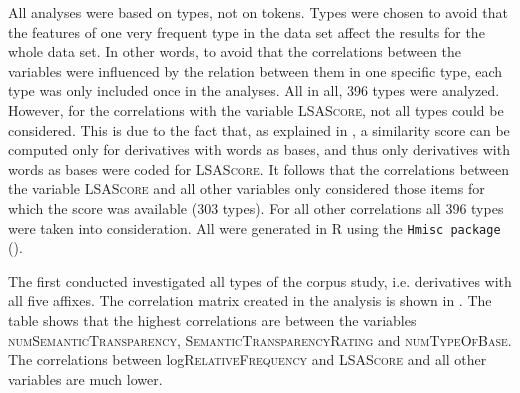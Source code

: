 All analyses were based on types, not on tokens. Types were chosen to avoid that the  features of one very frequent type in the data set affect the results for the whole data set. In other words, to avoid that the correlations between the variables were influenced by the relation between them in one specific type, each type was only included once in the analyses. 
All in all, 396 types were analyzed. However, for the correlations with the variable \textsc{LSAScore}, not all types could be considered. This is due to the fact that, as explained in , a similarity score can be computed only for derivatives with words as bases, and thus only derivatives with words as bases were coded for \textsc{LSAScore}. It follows that the correlations between the variable \textsc{LSAScore} and all other variables only considered those items for which the score was available (303 types). For all other correlations all 396 types were taken into consideration. 
All  were generated in R using the \texttt{Hmisc package} (\citealt{Harrell.2017}).

The first  conducted investigated all types of the corpus study, i.e. derivatives with all five affixes. The correlation matrix created in the analysis is shown in . The table shows that the highest correlations are between the variables \textsc{numSemanticTransparency}, \textsc{SemanticTransparencyRating} and \textsc{numTypeOfBase}. The correlations between log\textsc{RelativeFrequency} and \textsc{LSAScore} and all other variables are much lower. 



